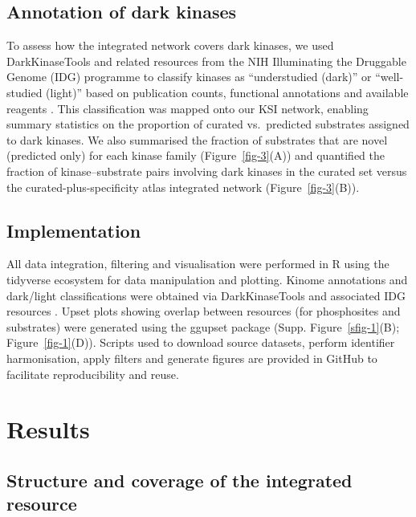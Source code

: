 \documentclass[
  number,
  preprint,
  onecolumn]{elsarticle}
\begin{document}
\subsection{Annotation of dark
kinases}\label{annotation-of-dark-kinases}

To assess how the integrated network covers dark kinases, we used
DarkKinaseTools and related resources from the NIH Illuminating the
Druggable Genome (IDG) programme to classify kinases as ``understudied
(dark)'' or ``well-studied (light)'' based on publication counts,
functional annotations and available reagents \citep{Berginski2021-so}.
This classification was mapped onto our KSI network, enabling summary
statistics on the proportion of curated vs.~predicted substrates
assigned to dark kinases. We also summarised the fraction of substrates
that are novel (predicted only) for each kinase family
(Figure~\ref{fig-3}(A)) and quantified the fraction of kinase--substrate
pairs involving dark kinases in the curated set versus the
curated-plus-specificity atlas integrated network
(Figure~\ref{fig-3}(B)).

\subsection{Implementation}\label{implementation}

All data integration, filtering and visualisation were performed in R
using the tidyverse ecosystem for data manipulation and plotting. Kinome
annotations and dark/light classifications were obtained via
DarkKinaseTools and associated IDG resources \citep{Berginski2021-so}.
Upset plots showing overlap between resources (for phosphosites and
substrates) were generated using the ggupset package
(Supp. Figure~\ref{sfig-1}(B); Figure~\ref{fig-1}(D)). Scripts used to
download source datasets, perform identifier harmonisation, apply
filters and generate figures are provided in GitHub to facilitate
reproducibility and reuse.

\section{Results}\label{results}

\subsection{Structure and coverage of the integrated
resource}\label{structure-and-coverage-of-the-integrated-resource}
\end{document}
